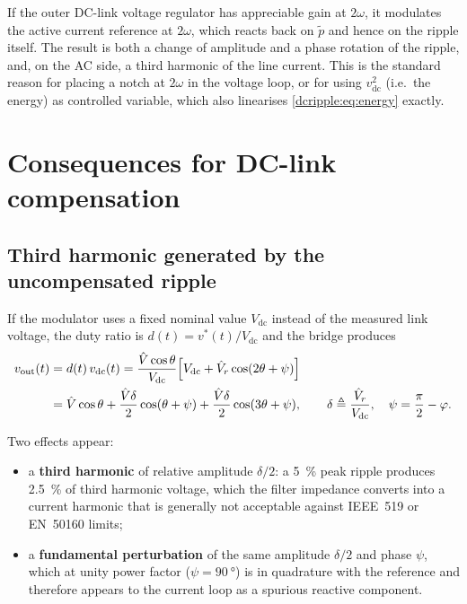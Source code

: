 If the outer DC-link voltage regulator has appreciable gain at $2\omega$, it
modulates the active current reference at $2\omega$, which reacts back on
$\tilde p$ and hence on the ripple itself. The result is both a change of
amplitude and a phase rotation of the ripple, and, on the AC side, a third
harmonic of the line current. This is the standard reason for placing a notch at
$2\omega$ in the voltage loop, or for using $v_{\mathrm{dc}}^2$ (i.e.\ the
energy) as controlled variable, which also linearises \eqref{dcripple:eq:energy} exactly.

\section{Consequences for DC-link compensation}

\subsection{Third harmonic generated by the uncompensated ripple}

If the modulator uses a fixed nominal value $V_{\mathrm{dc}}$ instead of the
measured link voltage, the duty ratio is $d(t)=v^{*}(t)/V_{\mathrm{dc}}$ and the
bridge produces
\begin{align}
  v_{\mathrm{out}}(t) &= d(t)\,v_{\mathrm{dc}}(t)
   = \frac{\hat V \cos\theta}{V_{\mathrm{dc}}}
     \Bigl[V_{\mathrm{dc}} + \hat V_r\cos(2\theta+\psi)\Bigr] \notag \\
   &= \hat V\cos\theta
    + \frac{\hat V \delta}{2}\cos(\theta+\psi)
    + \frac{\hat V \delta}{2}\cos(3\theta+\psi),
    \qquad
    \delta \triangleq \frac{\hat V_r}{V_{\mathrm{dc}}},
    \quad \psi = \frac{\pi}{2}-\varphi .
  \label{dcripple:eq:third}
\end{align}

Two effects appear:
\begin{itemize}
  \item a \textbf{third harmonic} of relative amplitude $\delta/2$: a
        \SI{5}{\percent} peak ripple produces \SI{2.5}{\percent} of third
        harmonic voltage, which the filter impedance converts into a current
        harmonic that is generally not acceptable against IEEE~519 or EN~50160
        limits;
  \item a \textbf{fundamental perturbation} of the same amplitude $\delta/2$ and
        phase $\psi$, which at unity power factor ($\psi = \SI{90}{\degree}$) is
        in quadrature with the reference and therefore appears to the current
        loop as a spurious reactive component.
\end{itemize}

